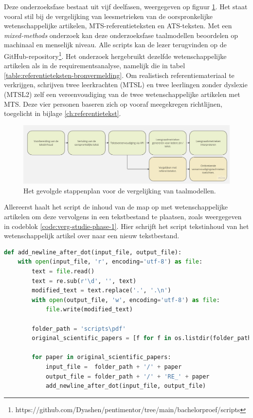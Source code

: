 Deze onderzoeksfase bestaat uit vijf deelfasen, weergegeven op figuur \ref{img:flowchart-vergelijkende-studie-metrics}. Het staat vooral stil bij de vergelijking van leesmetrieken van de oorspronkelijke wetenschappelijke artikelen, MTS-referentieteksten en ATS-teksten. Met een \textit{mixed-methods} onderzoek kan deze onderzoeksfase taalmodellen beoordelen op machinaal en menselijk niveau. Alle scripts kan de lezer terugvinden op de GitHub-repository\footnote{https://github.com/Dyashen/pentimentor/tree/main/bachelorproef/scripts}. Het onderzoek hergebruikt dezelfde wetenschappelijke artikelen als in de requirementsanalyse, namelijk die in tabel \ref{table:referentieteksten-bronvermelding}. Om realistisch referentiemateriaal te verkrijgen, schrijven twee leerkrachten (MTSL) en twee leerlingen zonder dyslexie (MTSL2) zelf een vereenvoudiging van de twee wetenschappelijke artikelen met MTS. Deze vier personen baseren zich op vooraf meegekregen richtlijnen, toegelicht in bijlage \ref{ch:referentietekst}. 

\begin{figure}
	\includegraphics[width=\linewidth]{img/flowchart-vergelijkende-studie.jpg}
	\caption{Het gevolgde stappenplan voor de vergelijking van taalmodellen.}
	\label{img:flowchart-vergelijkende-studie-metrics}
\end{figure}

Allereerst haalt het script de inhoud van de map op met wetenschappelijke artikelen om deze vervolgens in een tekstbestand te plaatsen, zoals weergegeven in codeblok \ref{code:verg-studie-phase-1}. Hier schrijft het script tekstinhoud van het wetenschappelijk artikel over naar een nieuw tekstbestand.

\begin{lstlisting}[language=Python, caption={Script voor de eerste fase van de vergelijkende studie.}, label={code:verg-studie-phase-1}]
def add_newline_after_dot(input_file, output_file):
	with open(input_file, 'r', encoding='utf-8') as file:
		text = file.read()
		text = re.sub(r'\d', '', text)
		modified_text = text.replace('.', '.\n')
		with open(output_file, 'w', encoding='utf-8') as file:
			file.write(modified_text)
		
		folder_path = 'scripts\pdf'
		original_scientific_papers = [f for f in os.listdir(folder_path)]
		
		for paper in original_scientific_papers:
			input_file =  folder_path + '/' + paper
			output_file = folder_path + '/' + 'RE_' + paper
			add_newline_after_dot(input_file, output_file)
\end{lstlisting} 

